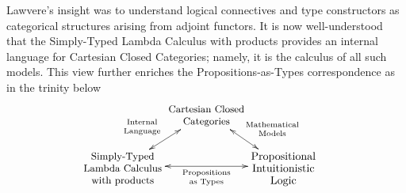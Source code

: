 \documentclass[11pt,twocolumn]{article}
\begin{document}
Lawvere's insight was to understand logical connectives and type
constructors as categorical structures arising from 
adjoint functors. %
%
It
is now well-understood that the Simply-Typed Lambda Calculus with products
provides an internal language for Cartesian Closed Categories; namely, it is
the calculus of all such models.  This view further enriches the
Propositions-as-Types correspondence as 
in the trinity below %
\begin{equation}\label{PATtrinity}
\hspace*{-3.75mm}
\begin{array}{c}
\xymatrix@C=0pt@R=17.5pt{
    & \ar@{<->}[dl]_(.5){\null\hspace*{-15mm}\txt{\scriptsize Internal\\
        \raisebox{1mm}{\scriptsize Language}}} 
    \ar@{<->}[dr]^(.55){\null\hspace*{1mm}\txt{\scriptsize Mathematical\\
        \raisebox{1mm}{\scriptsize Models}}}
    \txt{\small Cartesian Closed\\ \small Categories} & \\
    \txt{\small Simply-Typed\\ \small Lambda Calculus\\ \small with products
    }
    \ar@{<->}[rr]_-{\txt{\scriptsize
        Propositions\\\raisebox{1mm}{\scriptsize as Types}}} & & 
    \txt{Propositional\\ 
      Intuitionistic\\ Logic}
  }
\end{array}
\vspace*{-1mm}
\end{equation}
\end{document}
